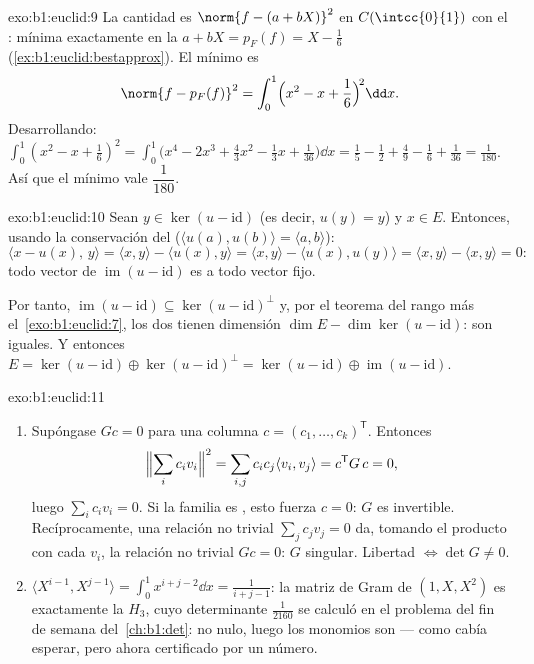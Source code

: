 \begin{solution}{exo:b1:euclid:9}
La cantidad es $\norm{f - (a + bX)}^2$ en $C(\intcc{0}{1})$ con el
 : mínima exactamente en la
 $a + bX = p_F(f) = X - \frac16$
(\cref{ex:b1:euclid:bestapprox}). El mínimo es
\[
\norm{f - p_F(f)}^2 = \int_0^1 \Bigl(x^2 - x + \frac16\Bigr)^{\!2}
\dd x .
\]
Desarrollando:
$\int_0^1 (x^2 - x + \frac16)^2 = \int_0^1 \bigl(x^4 - 2x^3 +
\frac{4}{3}x^2 - \frac13 x + \frac{1}{36}\bigr)\dd x = \frac15 -
\frac12 + \frac49 - \frac16 + \frac{1}{36} = \frac{1}{180}$. Así que
el mínimo vale $\dfrac{1}{180}$.
\end{solution}

\begin{solution}{exo:b1:euclid:10}
Sean $y \in \ker(u - \mathrm{id})$ (es decir, $u(y) = y$) y
$x \in E$. Entonces, usando la conservación del 
($\langle u(a), u(b)\rangle = \langle a, b\rangle$):
\[
\langle x - u(x),\, y\rangle
= \langle x, y\rangle - \langle u(x), y\rangle
= \langle x, y\rangle - \langle u(x), u(y)\rangle
= \langle x, y\rangle - \langle x, y\rangle = 0 :
\]
todo vector de $\operatorname{im}(u - \mathrm{id})$ es  a
todo vector fijo.

Por tanto,
$\operatorname{im}(u - \mathrm{id}) \subseteq \ker(u -
\mathrm{id})^{\perp}$ y, por el teorema del rango más
el~\cref{exo:b1:euclid:7}, los dos tienen dimensión
$\dim E - \dim\ker(u - \mathrm{id})$: son iguales. Y entonces
$E = \ker(u - \mathrm{id}) \oplus \ker(u - \mathrm{id})^\perp =
\ker(u - \mathrm{id}) \oplus \operatorname{im}(u - \mathrm{id})$.
\end{solution}

\begin{solution}{exo:b1:euclid:11}
\begin{enumerate}
  \item Supóngase $Gc = 0$ para una columna
        $c = (c_1, \dots, c_k)^{\mathsf T}$. Entonces
        \[
        \Bigl\lVert\sum_i c_i v_i\Bigr\rVert^2
        = \sum_{i,j} c_i c_j \langle v_i, v_j\rangle
        = c^{\mathsf T} G\, c = 0,
        \]
        luego $\sum_i c_i v_i = 0$. Si la familia es , esto
        fuerza $c = 0$: $G$ es invertible. Recíprocamente, una
        relación no trivial $\sum_j c_j v_j = 0$ da, tomando el
        producto con cada $v_i$, la relación no trivial $Gc = 0$:
        $G$ singular. Libertad $\iff \det G \neq 0$.
  \item $\langle X^{i-1}, X^{j-1}\rangle = \int_0^1 x^{i+j-2}\dd
        x = \frac{1}{i+j-1}$: la matriz de Gram de $(1, X, X^2)$ es
        exactamente la  $H_3$, cuyo determinante
        $\frac1{2160}$ se calculó en el problema del fin de semana
        del~\cref{ch:b1:det}: no nulo, luego los monomios son
         --- como cabía esperar, pero ahora certificado por un
        número.
\end{enumerate}
\end{solution}

